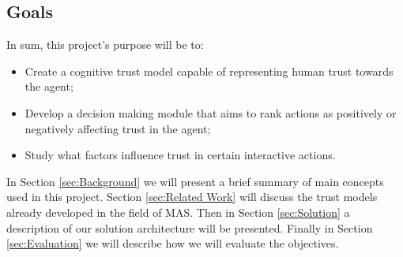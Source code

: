 \subsection{Goals}
\label{subsec:Goals}

In sum, this project's purpose will be to:
\begin{itemize}
	\item Create a cognitive trust model capable of representing human trust towards the agent;
	\item Develop a decision making module that aims to rank actions as positively or negatively affecting trust in the agent;
	\item Study what factors influence trust in certain interactive actions.
\end{itemize}


In Section \ref{sec:Background} we will present a brief summary of main concepts used in this project. Section \ref{sec:Related Work} will discuss the trust models already developed in the field of \ac{MAS}. Then in Section \ref{sec:Solution} a description of our solution architecture will be presented. Finally in Section \ref{sec:Evaluation} we will describe how we will evaluate the objectives.


